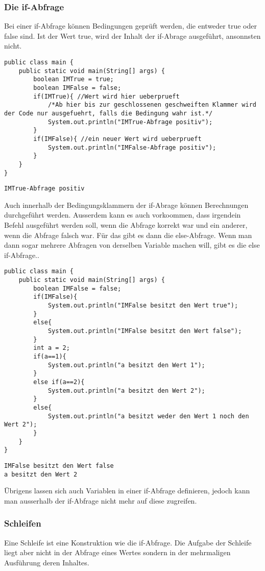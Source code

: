 \subsubsection{Die if-Abfrage}
Bei einer if-Abfrage können Bedingungen geprüft werden, die entweder true oder false sind. Ist der Wert true, wird der Inhalt der if-Abrage ausgeführt, ansonnsten nicht.
\begin{lstlisting}
public class main {
	public static void main(String[] args) {
		boolean IMTrue = true;
		boolean IMFalse = false;
		if(IMTrue){ //Wert wird hier ueberprueft
			/*Ab hier bis zur geschlossenen geschweiften Klammer wird der Code nur ausgefuehrt, falls die Bedingung wahr ist.*/
			System.out.println("IMTrue-Abfrage positiv");
		}
		if(IMFalse){ //ein neuer Wert wird ueberprueft
			System.out.println("IMFalse-Abfrage positiv");
		}
	}
}	
\end{lstlisting}
\begin{lstlisting}[style=console]
IMTrue-Abfrage positiv
\end{lstlisting} 
Auch innerhalb der Bedingungsklammern der if-Abrage können Berechnungen durchgeführt werden. Ausserdem kann es auch vorkoommen, dass irgendein Befehl ausgeführt werden soll, wenn die Abfrage korrekt war und ein anderer, wenn die Abfrage falsch war. Für das gibt es dann die else-Abfrage. Wenn man dann sogar mehrere Abfragen von derselben Variable machen will, gibt es die else if-Abfrage..
\begin{lstlisting}
public class main {
	public static void main(String[] args) {
		boolean IMFalse = false;
		if(IMFalse){
			System.out.println("IMFalse besitzt den Wert true");
		}
		else{
			System.out.println("IMFalse besitzt den Wert false");
		}
		int a = 2;
		if(a==1){
			System.out.println("a besitzt den Wert 1");
		}
		else if(a==2){
			System.out.println("a besitzt den Wert 2");
		}
		else{
			System.out.println("a besitzt weder den Wert 1 noch den Wert 2");
		}
	}
}	
\end{lstlisting}
\begin{lstlisting}[style=console]
IMFalse besitzt den Wert false
a besitzt den Wert 2
\end{lstlisting}
Übrigens lassen sich auch Variablen in einer if-Abfrage definieren, jedoch kann man ausserhalb der if-Abfrage nicht mehr auf diese zugreifen.
\subsubsection{Schleifen}
Eine Schleife ist eine Konstruktion wie die if-Abfrage. Die Aufgabe der Schleife liegt aber nicht in der Abfrage eines Wertes sondern in der mehrmaligen Ausführung deren Inhaltes. 
